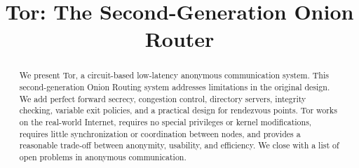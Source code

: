 \documentclass[times,10pt,twocolumn]{article}
\begin{document}

\title{Tor: The Second-Generation Onion Router}


\maketitle
\thispagestyle{empty}

\begin{abstract}
We present Tor, a circuit-based low-latency anonymous communication
system. This second-generation Onion Routing system addresses limitations
in the original design. We add perfect forward secrecy, congestion
control, directory servers, integrity checking, variable exit policies,
and a practical design for rendezvous points. Tor works on the real-world
Internet, requires no special privileges or kernel modifications, requires
little synchronization or coordination between nodes, and provides a
reasonable trade-off between anonymity, usability, and efficiency. We
close with a list of open problems in anonymous communication.
\end{abstract}



\label{sec:intro}
\end{document}
